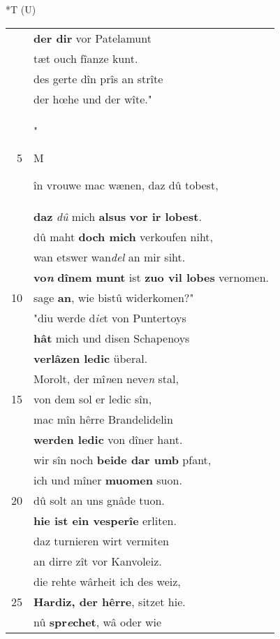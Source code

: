 \documentclass[8pt,a4paper,notitlepage]{article}
\begin{document}
\begin{table}[ht]
\begin{minipage}[t]{0.5\linewidth}
\end{minipage}
\hspace{0.5cm}
\begin{minipage}[t]{0.5\linewidth}
\small
\begin{center}*T (U)
\end{center}
\begin{tabular}{rl}
 & \textbf{der dir} vor Patelamunt\\ 
 & tæt ouch fîanze kunt.\\ 
 & des gerte dîn prîs an strîte\\ 
 & der hœhe und der wîte."\\ 
5 & "\begin{large}M\end{large}în vrouwe mac wænen, daz dû tobest,\\ 
 & \textbf{daz} \textit{dû} mich \textbf{alsus} \textbf{vor ir lobest}.\\ 
 & dû maht \textbf{doch mich} verkoufen niht,\\ 
 & wan etswer wan\textit{del} an mir siht.\\ 
 & \textbf{vo\textit{n}} \textbf{dînem munt} ist \textbf{zuo vil lobes} vernomen.\\ 
10 & sage \textbf{an}, wie bistû widerkomen?"\\ 
 & "diu werde d\textit{ie}t von Puntertoys\\ 
 & \textbf{hât} mich und disen Schapenoys\\ 
 & \textbf{verlâzen ledic} überal.\\ 
 & Morolt, der mî\textit{n}en neve\textit{n} stal,\\ 
15 & von dem sol er ledic sîn,\\ 
 & mac mîn hêrre Brandelidelin\\ 
 & \textbf{werden ledic} von dîner hant.\\ 
 & wir sîn noch \textbf{beide dar umb} pfant,\\ 
 & ich und mîner \textbf{muomen} suon.\\ 
20 & dû solt an uns gnâde tuon.\\ 
 & \textbf{hie ist ein vesperîe} erliten.\\ 
 & daz turnieren wirt vermiten\\ 
 & an dirre zît vor Kanvoleiz.\\ 
 & die rehte wârheit ich des weiz,\\ 
25 & \textbf{Hardiz, der hêrre}, sitzet hie.\\ 
 & nû \textbf{spr\textit{e}chet}, wâ oder wie\\ 

\end{tabular}
\end{minipage}
\end{table}
\end{document}
